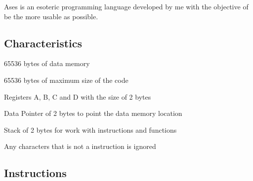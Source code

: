 Ases is an esoteric programming language developed by me with the objective of be the more usable as possible.

\subsection*{Characteristics}


\begin{DoxyItemize}
\item 65536 bytes of data memory
\item 65536 bytes of maximum size of the code
\item Registers A, B, C and D with the size of 2 bytes
\item Data Pointer of 2 bytes to point the data memory location
\item Stack of 2 bytes for work with instructions and functions
\item Any characters that is not a instruction is ignored
\end{DoxyItemize}

\subsection*{Instructions}


